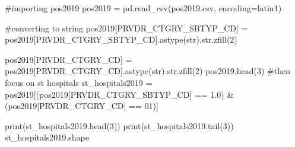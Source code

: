 \documentclass[
  letterpaper,
  DIV=11,
  numbers=noendperiod]{scrartcl}
\newenvironment{Shaded}{\begin{snugshade}}{\end{snugshade}}
\newcommand{\BuiltInTok}[1]{\textcolor[rgb]{0.00,0.23,0.31}{#1}}
\newcommand{\CommentTok}[1]{\textcolor[rgb]{0.37,0.37,0.37}{#1}}
\newcommand{\DecValTok}[1]{\textcolor[rgb]{0.68,0.00,0.00}{#1}}
\newcommand{\NormalTok}[1]{\textcolor[rgb]{0.00,0.23,0.31}{#1}}
\newcommand{\OperatorTok}[1]{\textcolor[rgb]{0.37,0.37,0.37}{#1}}
\newcommand{\StringTok}[1]{\textcolor[rgb]{0.13,0.47,0.30}{#1}}
\begin{document}
\begin{Shaded}
\begin{Highlighting}[]
\CommentTok{\#importing pos2019}
\NormalTok{pos2019 }\OperatorTok{=}\NormalTok{ pd.read\_csv(}\StringTok{\textquotesingle{}pos2019.csv\textquotesingle{}}\NormalTok{, encoding}\OperatorTok{=}\StringTok{\textquotesingle{}latin1\textquotesingle{}}\NormalTok{)}

\CommentTok{\#converting to string}
\NormalTok{pos2019[}\StringTok{\textquotesingle{}PRVDR\_CTGRY\_SBTYP\_CD\textquotesingle{}}\NormalTok{] }\OperatorTok{=}\NormalTok{ pos2019[}\StringTok{\textquotesingle{}PRVDR\_CTGRY\_SBTYP\_CD\textquotesingle{}}\NormalTok{].astype(}\BuiltInTok{str}\NormalTok{).}\BuiltInTok{str}\NormalTok{.zfill(}\DecValTok{2}\NormalTok{)}

\NormalTok{pos2019[}\StringTok{\textquotesingle{}PRVDR\_CTGRY\_CD\textquotesingle{}}\NormalTok{] }\OperatorTok{=}\NormalTok{ pos2019[}\StringTok{\textquotesingle{}PRVDR\_CTGRY\_CD\textquotesingle{}}\NormalTok{].astype(}\BuiltInTok{str}\NormalTok{).}\BuiltInTok{str}\NormalTok{.zfill(}\DecValTok{2}\NormalTok{)}
\NormalTok{pos2019.head(}\DecValTok{3}\NormalTok{)}
\CommentTok{\#then focus on st hospitals }
\NormalTok{st\_hospitals2019 }\OperatorTok{=}\NormalTok{ pos2019[(pos2019[}\StringTok{\textquotesingle{}PRVDR\_CTGRY\_SBTYP\_CD\textquotesingle{}}\NormalTok{] }\OperatorTok{==} \StringTok{\textquotesingle{}1.0\textquotesingle{}}\NormalTok{) }\OperatorTok{\&}\NormalTok{ (pos2019[}\StringTok{\textquotesingle{}PRVDR\_CTGRY\_CD\textquotesingle{}}\NormalTok{] }\OperatorTok{==} \StringTok{\textquotesingle{}01\textquotesingle{}}\NormalTok{)]}

\BuiltInTok{print}\NormalTok{(st\_hospitals2019.head(}\DecValTok{3}\NormalTok{))}
\BuiltInTok{print}\NormalTok{(st\_hospitals2019.tail(}\DecValTok{3}\NormalTok{))}
\NormalTok{st\_hospitals2019.shape}
\end{Highlighting}
\end{Shaded}
\end{document}
